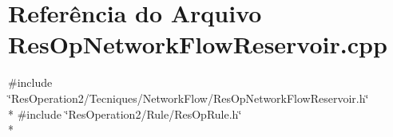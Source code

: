 \section{Referência do Arquivo Res\+Op\+Network\+Flow\+Reservoir.\+cpp}
\label{_res_op_network_flow_reservoir_8cpp}
{\ttfamily \#include \char`\"{}Res\+Operation2/\+Tecniques/\+Network\+Flow/\+Res\+Op\+Network\+Flow\+Reservoir.\+h\char`\"{}}\\*
{\ttfamily \#include \char`\"{}Res\+Operation2/\+Rule/\+Res\+Op\+Rule.\+h\char`\"{}}\\*
